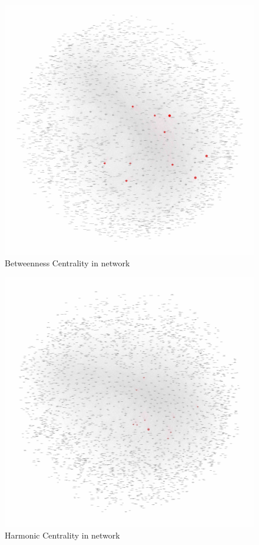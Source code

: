 \documentclass[runningheads]{llncs}
\begin{document}
\begin{figure}
\centering
\includegraphics[width=\textwidth]{3a_betweenness_centrality}
\caption{Betweenness Centrality in network} \label{fig_3a_betweenness_centrality}
\end{figure}

\begin{figure}
\centering
\includegraphics[width=\textwidth]{3a_harmonic_centrality}
\caption{Harmonic Centrality in network} \label{fig_3a_harmonic_centrality}
\end{figure}
\end{document}
